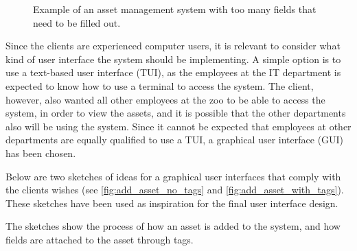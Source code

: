 \begin{figure}[H]
    \centering
    \caption{Example of an asset management system with too many fields that need to be filled out. \cite{SnipeIT}}
    \label{fig:too-many-fields}
\end{figure}

Since the clients are experienced computer users, it is relevant to consider what kind of user interface the system should be implementing. A simple option is to use a text-based user interface (TUI), as the employees at the IT department is expected to know how to use a terminal to access the system. The client, however, also wanted all other employees at the zoo to be able to access the system, in order to view the assets, and it is possible that the other departments also will be using the system. Since it cannot be expected that employees at other departments are equally qualified to use a TUI, a graphical user interface (GUI) has been chosen. 
\par
Below are two sketches of ideas for a graphical user interfaces that comply with the clients wishes (see \autoref{fig:add_asset_no_tags} and \autoref{fig:add_asset_with_tags}). These sketches have been used as inspiration for the final user interface design.
\par
The sketches show the process of how an asset is added to the system, and how fields are attached to the asset through tags.

